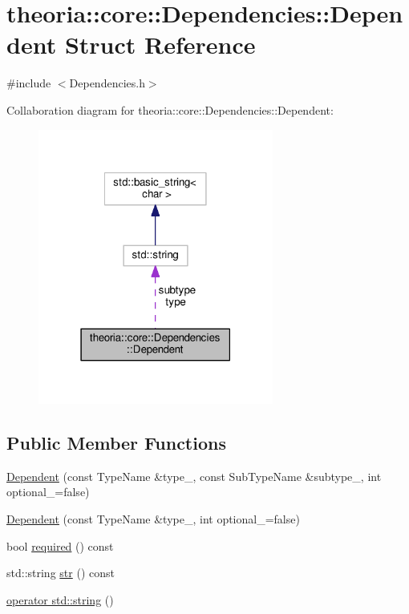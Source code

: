 \hypertarget{structtheoria_1_1core_1_1Dependencies_1_1Dependent}{}\section{theoria\+:\+:core\+:\+:Dependencies\+:\+:Dependent Struct Reference}
\label{structtheoria_1_1core_1_1Dependencies_1_1Dependent}


{\ttfamily \#include $<$Dependencies.\+h$>$}



Collaboration diagram for theoria\+:\+:core\+:\+:Dependencies\+:\+:Dependent\+:\nopagebreak
\begin{figure}[H]
\begin{center}
\leavevmode
\includegraphics[width=219pt]{structtheoria_1_1core_1_1Dependencies_1_1Dependent__coll__graph}
\end{center}
\end{figure}
\subsection*{Public Member Functions}
\begin{DoxyCompactItemize}
\item 
\hyperlink{structtheoria_1_1core_1_1Dependencies_1_1Dependent_a25a03961885377f8d61f235968de9d7a}{Dependent} (const Type\+Name \&type\+\_\+, const Sub\+Type\+Name \&subtype\+\_\+, int optional\+\_\+=false)
\item 
\hyperlink{structtheoria_1_1core_1_1Dependencies_1_1Dependent_ac2d4b0f74da74e8e8b33690354a4c245}{Dependent} (const Type\+Name \&type\+\_\+, int optional\+\_\+=false)
\item 
bool \hyperlink{structtheoria_1_1core_1_1Dependencies_1_1Dependent_add9488312226f059c685e3d6f852afa9}{required} () const
\item 
std\+::string \hyperlink{structtheoria_1_1core_1_1Dependencies_1_1Dependent_abeab560057d991361b8429b7c136b345}{str} () const
\item 
\hyperlink{structtheoria_1_1core_1_1Dependencies_1_1Dependent_ac6116c1e0f4083636db2f170d8cd1938}{operator std\+::string} ()
\end{DoxyCompactItemize}
